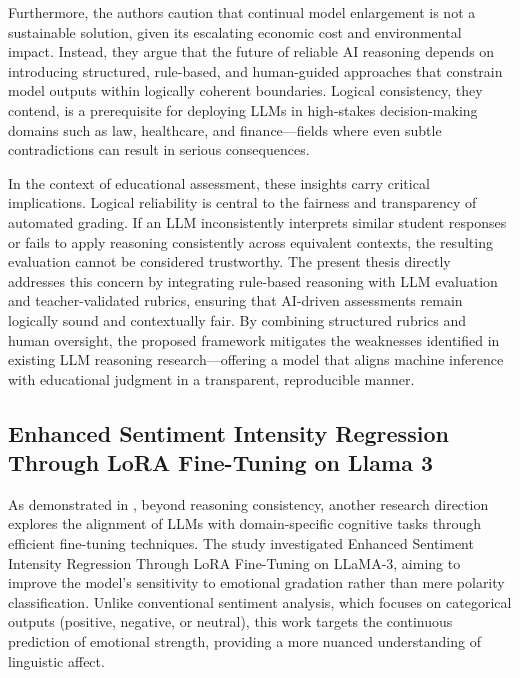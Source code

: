 Furthermore, the authors caution that continual model enlargement 
is not a sustainable solution, given its escalating economic 
cost and environmental impact. Instead, they argue that the 
future of reliable AI reasoning depends on introducing 
structured, rule-based, and human-guided approaches that 
constrain model outputs within logically coherent boundaries. 
Logical consistency, they contend, is a prerequisite for 
deploying LLMs in high-stakes decision-making domains such as 
law, healthcare, and finance—fields where even subtle 
contradictions can result in serious consequences.

In the context of educational assessment, these insights carry 
critical implications. Logical reliability is central to the 
fairness and transparency of automated grading. If an LLM 
inconsistently interprets similar student responses or fails 
to apply reasoning consistently across equivalent contexts, 
the resulting evaluation cannot be considered trustworthy. 
The present thesis directly addresses this concern by 
integrating rule-based reasoning with LLM evaluation and 
teacher-validated rubrics, ensuring that AI-driven assessments 
remain logically sound and contextually fair. By combining 
structured rubrics and human oversight, the proposed framework 
mitigates the weaknesses identified in existing LLM reasoning 
research—offering a model that aligns machine inference with 
educational judgment in a transparent, reproducible manner.


\subsection{Enhanced Sentiment Intensity Regression Through LoRA Fine-Tuning on Llama 3}

As demonstrated in \cite{Lin2024}, beyond reasoning 
consistency, another research direction explores the 
alignment of LLMs with domain-specific cognitive tasks 
through efficient fine-tuning techniques. The study 
investigated Enhanced Sentiment Intensity Regression Through 
LoRA Fine-Tuning on LLaMA-3, aiming to improve the model’s 
sensitivity to emotional gradation rather than mere polarity 
classification. Unlike conventional sentiment analysis, which 
focuses on categorical outputs (positive, negative, or 
neutral), this work targets the continuous prediction of 
emotional strength, providing a more nuanced understanding of 
linguistic affect.

